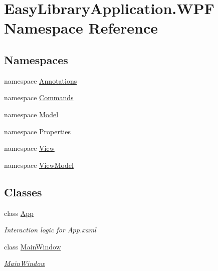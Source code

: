 \hypertarget{namespace_easy_library_application_1_1_w_p_f}{}\section{Easy\+Library\+Application.\+W\+PF Namespace Reference}
\label{namespace_easy_library_application_1_1_w_p_f}
\subsection*{Namespaces}
\begin{DoxyCompactItemize}
\item 
namespace \mbox{\hyperlink{namespace_easy_library_application_1_1_w_p_f_1_1_annotations}{Annotations}}
\item 
namespace \mbox{\hyperlink{namespace_easy_library_application_1_1_w_p_f_1_1_commands}{Commands}}
\item 
namespace \mbox{\hyperlink{namespace_easy_library_application_1_1_w_p_f_1_1_model}{Model}}
\item 
namespace \mbox{\hyperlink{namespace_easy_library_application_1_1_w_p_f_1_1_properties}{Properties}}
\item 
namespace \mbox{\hyperlink{namespace_easy_library_application_1_1_w_p_f_1_1_view}{View}}
\item 
namespace \mbox{\hyperlink{namespace_easy_library_application_1_1_w_p_f_1_1_view_model}{View\+Model}}
\end{DoxyCompactItemize}
\subsection*{Classes}
\begin{DoxyCompactItemize}
\item 
class \mbox{\hyperlink{class_easy_library_application_1_1_w_p_f_1_1_app}{App}}
\begin{DoxyCompactList}\small\item\em Interaction logic for App.\+xaml \end{DoxyCompactList}\item 
class \mbox{\hyperlink{class_easy_library_application_1_1_w_p_f_1_1_main_window}{Main\+Window}}
\begin{DoxyCompactList}\small\item\em \mbox{\hyperlink{class_easy_library_application_1_1_w_p_f_1_1_main_window}{Main\+Window}} \end{DoxyCompactList}\end{DoxyCompactItemize}
